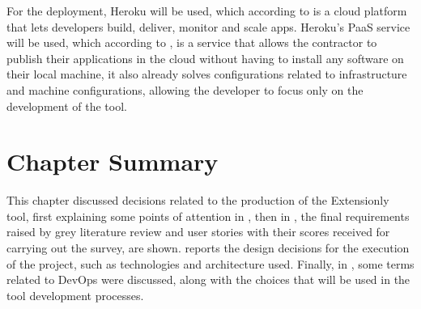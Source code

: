 For the deployment, Heroku will be used, which according to \textcite{heroku} is a cloud platform that lets developers build, deliver, monitor and scale apps. Heroku's \ac{PaaS} service will be used, which according to \textcite{Zvarevashe2014TheAO}, is a service that allows the contractor to publish their applications in the cloud without having to install any software on their local machine, it also already solves configurations related to infrastructure and machine configurations, allowing the developer to focus only on the development of the tool.

\section{Chapter Summary}

This chapter discussed decisions related to the production of the Extensionly tool, first explaining some points of attention in , then in , the final requirements raised by grey literature review and user stories with their scores received for carrying out the survey, are shown.  reports the design decisions for the execution of the project, such as technologies and architecture used. Finally, in , some terms related to \ac{DevOps} were discussed, along with the choices that will be used in the tool development processes.




